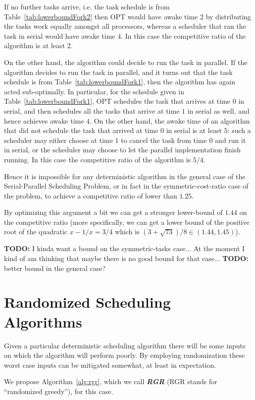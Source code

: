 \documentclass[twocolumn]{article}[10pt]
\newcommand{\defn}[1]{{\textit{\textbf{\boldmath #1}}}\xspace}
\newcommand{\todo}[1]{{\color{red}\textbf{TODO:} #1}}
\begin{document}
If no further tasks arrive, i.e. the task schedule is from
Table~\ref{tab:lowerboundFork2} then OPT would have awake time
$2$ by distributing the tasks work equally amongst all
processors, whereas a scheduler that ran the task in serial would
have awake time $4$. In this case the competitive ratio of the
algorithm is at least $2$.

On the other hand, the algorithm could decide to run the task in
parallel. If the algorithm decides to run the task in parallel,
and it turns out that the task schedule is from
Table~\ref{tab:lowerboundFork1}, then the algorithm has again
acted sub-optimally. In particular, for the schedule given in
Table~\ref{tab:lowerboundFork1}, OPT schedules the task that
arrives at time $0$ in serial, and then schedules all the tasks
that arrive at time $1$ in serial as well, and hence achieves
awake time $4$. On the other hand, the awake time of an algorithm
that did not schedule the task that arrived at time $0$ in
serial is at least $5$: such a scheduler may either choose at
time $1$ to cancel the task from time $0$ and run it in serial,
or the scheduler may choose to let the parallel implementation
finish running. In this case the competitive ratio of the
algorithm is $5/4$.

Hence it is impossible for any deterministic algorithm in the
general case of the Serial-Parallel Scheduling Problem, or in
fact in the symmetric-cost-ratio case of the problem, to achieve
a competitive ratio of lower than $1.25$.

By optimizing this argument a bit we can get a stronger
lower-bound of $1.44$ on the competitive ratio (more
specifically, we can get a lower bound of the positive root of
the quadratic $x - 1/x = 3/4$ which is $(3+\sqrt{73})/8 \in
(1.44, 1.45)$).

\todo{I kinda want a bound on the symmetric-tasks case... At the
  moment I kind of am thinking that maybe there is no good
  bound for that case...}
\todo{better bound in the general case?}

\section{Randomized Scheduling Algorithms}
Given a particular deterministic scheduling algorithm there will
be some inputs on which the algorithm will perform poorly. 
By employing randomization these worst case inputs can be
mitigated somewhat, at least in expectation.

We propose Algorithm~\ref{alg:rgr}, which we call
\defn{RGR} (RGR stands for \enquote{randomized greedy}), for this case.
\end{document}
